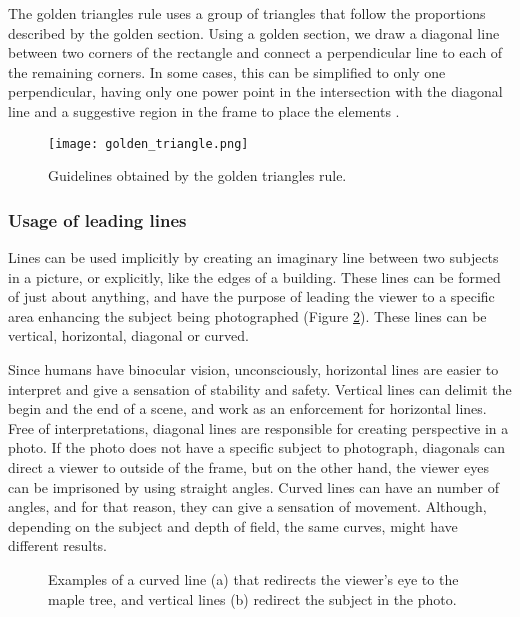 The golden triangles rule uses a group of triangles that follow the proportions described by the golden section. Using a golden section, we draw a diagonal line between two corners of the rectangle and connect a perpendicular line to each of the remaining corners. In some cases, this can be simplified to only one perpendicular, having only one power point in the intersection with the diagonal line and a suggestive region in the frame to place the elements \cite{Santos}.

\begin{figure}[htbp]
    \centering
	\label{fig:golden_triangle_example}
    \texttt{[image: golden\_triangle.png]}
	\caption{Guidelines obtained by the golden triangles rule.}
	\label{fig:golden_triangle_image}
\end{figure}

\subsubsection{Usage of leading lines}
\label{subsub:leading_lines}

Lines can be used implicitly by creating an imaginary line between two subjects in a picture, or explicitly, like the edges of a building. These lines can be formed of just about anything, and have the purpose of leading the viewer to a specific area enhancing the subject being photographed \cite{Kamps2012} (Figure \ref{fig:leading_lines_image}). These lines can be vertical, horizontal, diagonal or curved.

Since humans have binocular vision, unconsciously, horizontal lines are easier to interpret and give a sensation of stability and safety. Vertical lines can delimit the begin and the end of a scene, and work as an enforcement for horizontal lines.
Free of interpretations, diagonal lines are responsible for creating perspective in a photo. If the photo does not have a specific subject to photograph, diagonals can direct a viewer to outside of the frame, but on the other hand, the viewer eyes can be imprisoned by using straight angles. 
Curved lines can have an number of angles, and for that reason, they can give a sensation of movement. Although, depending on the subject and depth of field, the same curves, might have different results.


\begin{figure}[htbp]
        \centering
  \caption{Examples of a curved line (a) that redirects the viewer's eye to the maple tree, and vertical lines (b) redirect the subject in the photo.}
  \label{fig:leading_lines_image}
\end{figure}

